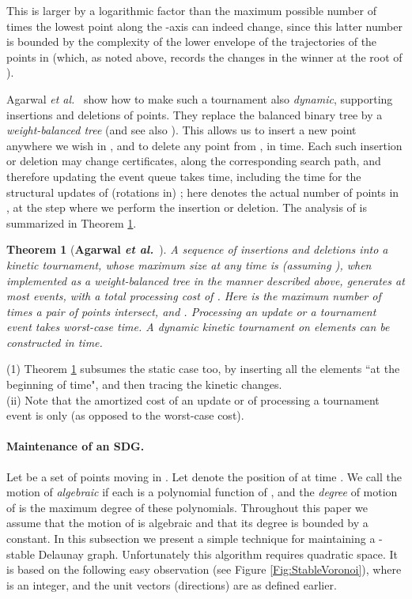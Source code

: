 \documentclass[letter,11pt]{article}
\newtheorem{theorem}{Theorem}[section]
\begin{document}
This is larger by a logarithmic factor than the maximum possible
number of times the lowest point along the -axis can indeed change,
since this latter number is bounded by the complexity of the lower
envelope of the trajectories of the points in  (which, as noted above, records the changes in the winner at the root of ).

Agarwal {\em et al.}~\cite{KineticNeighbors} show how to make
such a tournament also {\em dynamic\/}, supporting insertions and deletions of points. They replace the balanced binary tree  by
 a {\em weight-balanced  tree} \cite{NR73}
(and see also \cite{Mehlhorn}).  This allows us to insert a new point
anywhere we wish in , and to delete any point from ,
in  time. Each such insertion or deletion may
change  certificates, along the corresponding search path,
and therefore updating the event queue takes  time, including the time for the
structural updates of (rotations in) ; here  denotes the
actual number of points in , at the step where we perform
the insertion or deletion. The analysis of \cite{KineticNeighbors} is summarized in Theorem \ref{thm:kinetic-tour}.



\begin{theorem}[\textbf{Agarwal \textit{et al.}}~\cite{KineticNeighbors}] \label{thm:kinetic-tour}
A sequence of  insertions and deletions into a kinetic tournament,
whose maximum size at any time is  (assuming ), when
implemented as a weight-balanced tree in the manner described above,
generates at most  events, with a total processing cost
of . Here  is the maximum number of times a pair of points intersect, and .
Processing an update or a tournament event takes
 worst-case time. A dynamic kinetic tournament on 
elements can be constructed in  time.
\end{theorem}

 (1) Theorem \ref{thm:kinetic-tour} subsumes the static case too, by inserting all the elements ``at the beginning of time", and then tracing the kinetic changes. \\
\noindent (ii) Note that the amortized cost of an update or of processing a tournament event is only  (as opposed to the  worst-case cost).

\paragraph{Maintenance of an SDG.}
Let  be a set of points 
moving in . Let  denote the position
of  at time . We call the motion of 
\emph{algebraic} if each  is a
polynomial function of , and the \emph{degree} of motion of  is the maximum
degree of these polynomials.
Throughout this paper we assume that the motion of  is
algebraic and that its degree is bounded by a constant.
In this subsection we present a simple technique for maintaining a
-stable Delaunay graph. Unfortunately this
algorithm requires quadratic space.
It is based on the following easy observation (see Figure \ref{Fig:StableVoronoi}),
where  is an integer, and the unit vectors (directions)  are as defined earlier.
\end{document}
